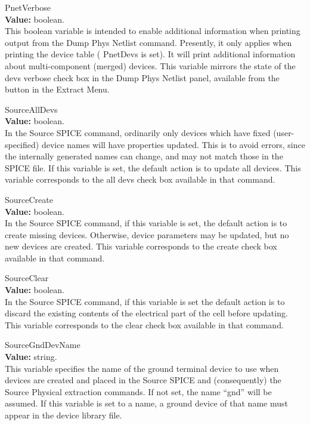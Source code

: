 \begin{description}
\item{\et PnetVerbose}\\
{\bf Value:} boolean.\\
This boolean variable is intended to enable additional information
when printing output from the {\cb Dump Phys Netlist} command. 
Presently, it only applies when printing the device table ({\et
PnetDevs} is set).  It will print additional information about
multi-component (merged) devices.  This variable mirrors the state of
the {\cb devs verbose} check box in the {\cb Dump Phys Netlist} panel,
available from the button in the {\cb Extract Menu}.

\item{\et SourceAllDevs}\\
{\bf Value:} boolean.\\
In the {\cb Source SPICE} command, ordinarily only devices which have
fixed (user-specified) device names will have properties updated. 
This is to avoid errors, since the internally generated names can
change, and may not match those in the SPICE file.  If this variable
is set, the default action is to update all devices.  This variable
corresponds to the {\et all devs} check box available in that command. 

\item{\et SourceCreate}\\
{\bf Value:} boolean.\\
In the {\cb Source SPICE} command, if this variable is set, the
default action is to create missing devices.  Otherwise, device
parameters may be updated, but no new devices are created.  This
variable corresponds to the {\et create} check box available in that
command.

\item{\et SourceClear}\\
{\bf Value:} boolean.\\
In the {\cb Source SPICE} command, if this variable is set the default
action is to discard the existing contents of the electrical part of
the cell before updating.  This variable corresponds to the {\et
clear} check box available in that command.

\item{\et SourceGndDevName}\\
{\bf Value:} string.\\
This variable specifies the name of the ground terminal device to use
when devices are created and placed in the {\cb Source SPICE} and
(consequently) the {\cb Source Physical} extraction commands.  If not
set, the name ``{\vt gnd}'' will be assumed.  If this variable is set
to a name, a ground device of that name must appear in the device
library file.


\end{description}

